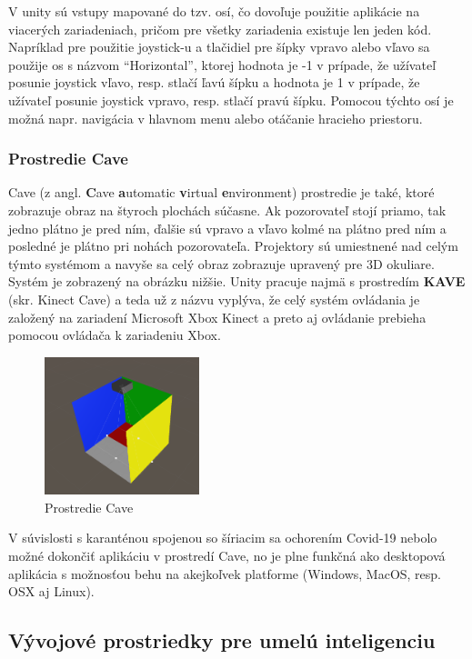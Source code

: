 V unity sú vstupy mapované do tzv. osí, čo dovoľuje použitie aplikácie na viacerých zariadeniach,
pričom pre všetky zariadenia existuje len jeden kód.
Napríklad pre použitie joystick-u a tlačidiel pre šípky vpravo alebo vľavo sa použije os s názvom \enquote{Horizontal},
ktorej hodnota je -1 v prípade, že užívateľ posunie joystick vľavo, resp. stlačí ľavú šípku a hodnota je 1 v prípade,
že užívateľ posunie joystick vpravo, resp. stlačí pravú šípku.
Pomocou týchto osí je možná napr. navigácia v hlavnom menu alebo otáčanie hracieho priestoru.

\subsubsection{Prostredie Cave}
Cave (z angl. \textbf{C}ave \textbf{a}utomatic \textbf{v}irtual \textbf{e}nvironment) prostredie je také, ktoré
zobrazuje obraz na štyroch plochách súčasne.\cite{cave}
Ak pozorovateľ stojí priamo, tak jedno plátno je pred ním, ďalšie sú vpravo a vľavo kolmé na plátno pred ním a posledné
je plátno pri nohách pozorovateľa.
Projektory sú umiestnené nad celým týmto systémom a navyše sa celý obraz zobrazuje upravený pre 3D okuliare.
Systém je zobrazený na obrázku nižšie.
Unity pracuje najmä s prostredím \textbf{KAVE} (skr. Kinect Cave) a teda už z názvu vyplýva, že celý systém ovládania
je založený na zariadení Microsoft Xbox Kinect a preto aj ovládanie prebieha pomocou ovládača k zariadeniu Xbox.

\begin{figure}[H]
    \centering
    \includegraphics[width=0.4\textwidth]{images/kave.png}
    \caption{Prostredie Cave}
\end{figure}

V súvislosti s karanténou spojenou so šíriacim sa ochorením Covid-19 nebolo možné dokončiť aplikáciu v prostredí Cave,
no je plne funkčná ako desktopová aplikácia s možnosťou behu na akejkoľvek platforme (Windows, MacOS, resp. OSX aj
Linux).

\subsection{Vývojové prostriedky pre umelú inteligenciu}\label{subsec:dev-tools-for-ai}

